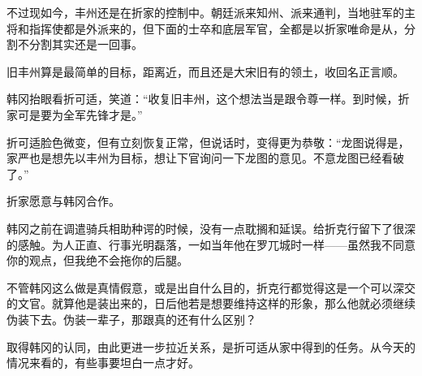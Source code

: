 不过现如今，丰州还是在折家的控制中。朝廷派来知州、派来通判，当地驻军的主将和指挥使都是外派来的，但下面的士卒和底层军官，全都是以折家唯命是从，分割不分割其实还是一回事。

旧丰州算是最简单的目标，距离近，而且还是大宋旧有的领土，收回名正言顺。

韩冈抬眼看折可适，笑道：“收复旧丰州，这个想法当是跟令尊一样。到时候，折家可是要为全军先锋才是。”

折可适脸色微变，但有立刻恢复正常，但说话时，变得更为恭敬：“龙图说得是，家严也是想先以丰州为目标，想让下官询问一下龙图的意见。不意龙图已经看破了。”

折家愿意与韩冈合作。

韩冈之前在调遣骑兵相助种谔的时候，没有一点耽搁和延误。给折克行留下了很深的感触。为人正直、行事光明磊落，一如当年他在罗兀城时一样——虽然我不同意你的观点，但我绝不会拖你的后腿。

不管韩冈这么做是真情假意，或是出自什么目的，折克行都觉得这是一个可以深交的文官。就算他是装出来的，日后他若是想要维持这样的形象，那么他就必须继续伪装下去。伪装一辈子，那跟真的还有什么区别？

取得韩冈的认同，由此更进一步拉近关系，是折可适从家中得到的任务。从今天的情况来看的，有些事要坦白一点才好。


